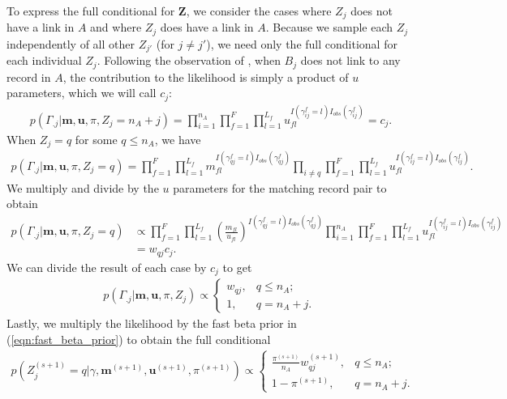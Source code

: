 \documentclass[ba]{imsart}
\begin{document}
To express the full conditional for $\bm{Z}$, we consider the cases where $Z_j$ does not have a link in $A$ and where $Z_j$ does have a link in $A$. Because we sample each $Z_j$ independently of all other $Z_{j'}$ (for $j \neq j'$), we need only the full conditional for each individual $Z_j$. {} Following the observation of \cite{wortman2019}, when $B_j$ does not link to any record in $A$, the contribution to the likelihood is simply a product of $u$ parameters, which we will call $c_j$:
\begin{align}
	p(\Gamma_{.j}| \bm{m}, \bm{u}, \pi, Z_j = n_A + j) = \prod_{i=1}^{n_A}\prod_{f=1}^{F}\prod_{l=1}^{L_f} u_{fl}^{I(\gamma_{ij}^f = l)I_{obs}(\gamma_{ij}^f)} = c_j.
\end{align}
When $Z_j = q$ for some $q\leq n_A$, we have
\begin{align}
	p(\Gamma_{.j}| \bm{m}, \bm{u}, \pi,  Z_j = q) =\prod_{f=1}^{F}\prod_{l=1}^{L_f} m_{fl}^{I(\gamma_{qj}^f = l)I_{obs}(\gamma_{qj}^f)}  \prod_{i \neq q}\prod_{f=1}^{F}\prod_{l=1}^{L_f} u_{fl}^{I(\gamma_{ij}^f = l)I_{obs}(\gamma_{ij}^f)}.
\end{align}
We multiply and divide by the $u$ parameters for the matching record pair to obtain
\begin{align}
	p(\Gamma_{.j}| \bm{m}, \bm{u}, \pi, Z_j = q) &\propto \prod_{f=1}^{F}\prod_{l=1}^{L_f} \left(\frac{m_{fl}}{u_{fl}}\right)^{I(\gamma_{qj}^f = l)I_{obs}(\gamma_{qj}^f)}  \prod_{i = 1}^{n_A}\prod_{f=1}^{F}\prod_{l=1}^{L_f} u_{fl}^{I(\gamma_{ij}^f = l)I_{obs}(\gamma_{ij}^f)} \\
	&= w_{qj}  c_j.
\end{align}
We can divide the result of each case by $c_j$ to get
\begin{align}
	p(\Gamma_{.j}| \bm{m}, \bm{u}, \pi, Z_j) \propto \begin{cases} 
		w_{qj}, & q \leq n_A; \\
		1, &  q  = n_A + j. \
	\end{cases}
\end{align}
Lastly, we multiply the likelihood by the fast beta prior in (\ref{eqn:fast_beta_prior}) to obtain the full conditional
\begin{align}
	\label{eqn:z_full_conditional2}
	p\left(Z_j^{(s+1)}  = q|\gamma, \bm{m}^{(s+1)}, \bm{u}^{(s+1)}, \pi^{(s+1)}\right) \propto
	\begin{cases} 
		\frac{\pi^{(s+1)}}{n_A} w_{qj}^{(s+1)},  & q \leq n_A; \\
		1 - \pi^{(s+1)}, & q  = n_A + j. \
	\end{cases}
\end{align}
\end{document}
